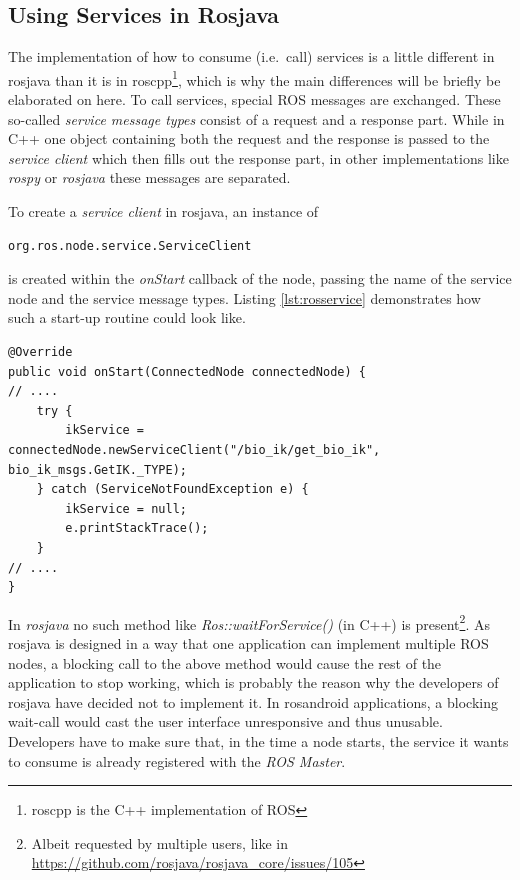 \subsection{Using Services in Rosjava}
\label{sec:using_services}
The implementation of how to consume (i.e.~call) services is a little different in rosjava than it is in roscpp\footnote{roscpp is the C++ implementation of ROS}, which is why the main differences will be briefly be elaborated on here. To call services, special ROS messages are exchanged. These so-called \textit{service message types} consist of a request and a response part. While in C++ one object containing both the request and the response is passed to the \textit{service client} which then fills out the response part\cite{ros:serviceclient}, in other implementations like \textit{rospy} or \textit{rosjava} these messages are separated.

To create a \textit{service client} in rosjava, an instance of 

\begin{lstlisting}[numbers=none]
org.ros.node.service.ServiceClient
\end{lstlisting}

is created within the \textit{onStart} callback of the node, passing the name of the service node and the service message types. Listing \ref{lst:rosservice} demonstrates how such a start-up routine could look like.

\begin{lstlisting}[caption={Example on how to connect to a ROS service in rosjava},label=lst:rosservice]
@Override
public void onStart(ConnectedNode connectedNode) {
// ....
	try {
		ikService = connectedNode.newServiceClient("/bio_ik/get_bio_ik", bio_ik_msgs.GetIK._TYPE);
	} catch (ServiceNotFoundException e) {
		ikService = null;
		e.printStackTrace();
	}	
// ....
}
\end{lstlisting}

In \textit{rosjava} no such method like \textit{Ros::waitForService()} (in C++) is present\footnote{Albeit requested by multiple users, like in \url{https://github.com/rosjava/rosjava_core/issues/105}}. As rosjava is designed in a way that one application can implement multiple ROS nodes, a blocking call to the above method would cause the rest of the application to stop working, which is probably the reason why the developers of rosjava have decided not to implement it. In rosandroid applications, a blocking wait-call would cast the user interface unresponsive and thus unusable. Developers have to make sure that, in the time a node starts, the service it wants to consume is already registered with the \textit{ROS Master}.

